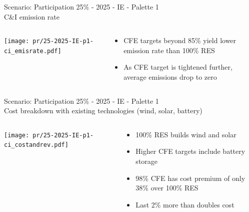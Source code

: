 \begin{frame}{Scenario: Participation 25\% - 2025 - IE - Palette 1
\\ C\&I emission rate}

\begin{columns}[T]
\begin{column}{9cm}
\centering

\texttt{[image: pr/25-2025-IE-p1-ci\_emisrate.pdf]}
\end{column}
\begin{column}{5cm}

  \vspace{.5cm}

  \begin{itemize}
  \item CFE targets beyond \alert{85\%} yield lower emission rate than 100\% RES 
  \item As CFE target is tightened further, average emissions \alert{drop to zero}
  \end{itemize}
\end{column}
\end{columns}

\end{frame}



\begin{frame}{Scenario: Participation 25\% - 2025 - IE - Palette 1 \\
Cost breakdown with existing technologies (wind, solar, battery)}

\begin{columns}[T]
\begin{column}{9cm}
\centering

\texttt{[image: pr/25-2025-IE-p1-ci\_costandrev.pdf]}
\end{column}
\begin{column}{5cm}

  \vspace{.5cm}

  \begin{itemize}
  \item 100\% RES builds wind and solar
  \item Higher CFE targets \alert{include battery storage}
  \item 98\% CFE has \alert{cost premium of only 38\%} over 100\% RES
  \item Last 2\% more than \alert{doubles cost}
  \end{itemize}
\end{column}
\end{columns}

\end{frame}



